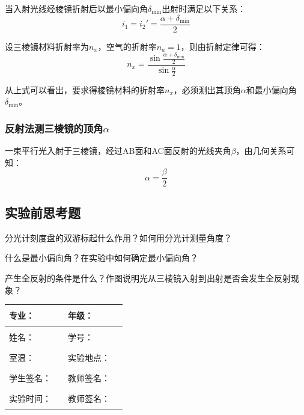 \documentclass[dvipsnames, svgnames,a4paper,11pt]{article}
\newcommand{\recordblank}[1]{\par\vspace*{#1}\par}
\begin{document}
当入射光线经棱镜折射后以最小偏向角$\delta_{\min}$出射时满足以下关系：
\begin{equation}
	i_1 = i_2' = \frac{\alpha + \delta_{\min}}{2}
\end{equation}

设三棱镜材料折射率为$n_x$，空气的折射率$n_a=1$，则由折射定律可得：
\begin{equation}
	n_x = \frac{\sin\frac{\alpha+\delta_{\min}}{2}}{\sin\frac{\alpha}{2}}
\end{equation}

从上式可以看出，要求得棱镜材料的折射率$n_x$，必须测出其顶角$\alpha$和最小偏向角$\delta_{\min}$。

\subsubsection{反射法测三棱镜的顶角$\alpha$}
一束平行光入射于三棱镜，经过AB面和AC面反射的光线夹角$\beta$，由几何关系可知：
\begin{equation}
	\alpha = \frac{\beta}{2}
\end{equation}


\subsection{实验前思考题}

\begin{question}
分光计刻度盘的双游标起什么作用？如何用分光计测量角度？
\end{question}
\recordblank{4cm}

\begin{question}
什么是最小偏向角？在实验中如何确定最小偏向角？
\end{question}
\recordblank{4cm}

\begin{question}
产生全反射的条件是什么？作图说明光从三棱镜入射到出射是否会发生全反射现象？
\end{question}
\recordblank{4cm}

\clearpage
\begin{table}
	\renewcommand\arraystretch{1.7}
	\centering
	\begin{tabularx}{\textwidth}{|X|X|X|X|}
	\hline
	专业：& \rule{2.5cm}{0.4pt} & 年级：& \rule{2.5cm}{0.4pt}\\
	\hline
	姓名：& \rule{2.5cm}{0.4pt} & 学号：& \rule{2.5cm}{0.4pt}\\
	\hline
	室温：& \rule{2.5cm}{0.4pt} & 实验地点：& \rule{2.5cm}{0.4pt}\\
	\hline
	学生签名：& \rule{2.5cm}{0.4pt} & 教师签名：& \rule{2.5cm}{0.4pt}\\
	\hline
	实验时间：& \rule{2.5cm}{0.4pt} & 教师签名：& \rule{2.5cm}{0.4pt}\\
	\hline
	\end{tabularx}
\end{table}
\end{document}
